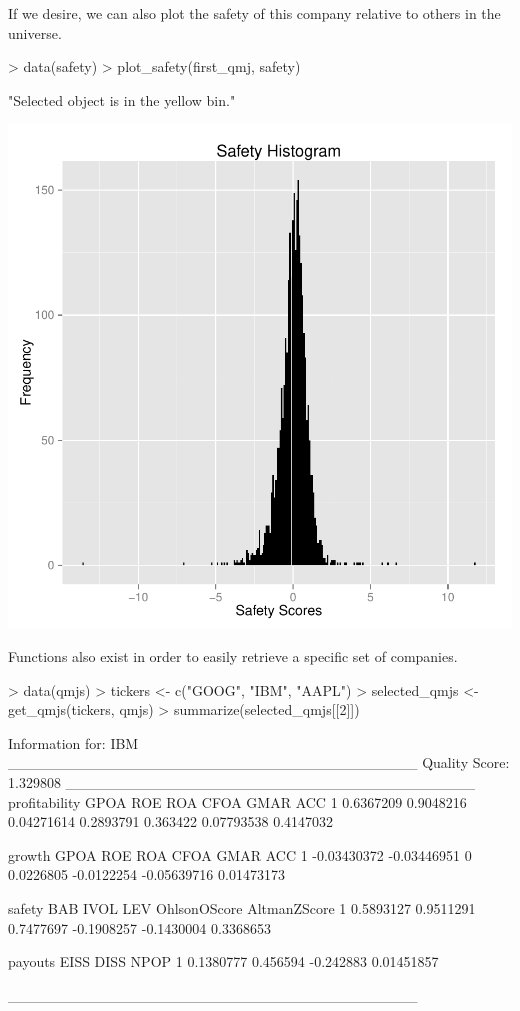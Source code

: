 \documentclass[titlepage]{article}
\begin{document}
If we desire, we can also plot the safety of this company relative to others in the universe.

\begin{Schunk}
\begin{Sinput}
> data(safety)
> plot_safety(first_qmj, safety)
\end{Sinput}
\begin{Soutput}
[1] "Selected object is in the yellow bin."
\end{Soutput}
\end{Schunk}
\includegraphics{paper-005}

Functions also exist in order to easily retrieve a specific set of companies.

\begin{Schunk}
\begin{Sinput}
> data(qmjs)
> tickers <- c("GOOG", "IBM", "AAPL")
> selected_qmjs <- get_qmjs(tickers, qmjs)
> summarize(selected_qmjs[[2]])
\end{Sinput}
\begin{Soutput}
Information for:  IBM
_______________________________________
Quality Score:  1.329808
_______________________________________
  profitability      GPOA        ROE       ROA     CFOA       GMAR       ACC
1     0.6367209 0.9048216 0.04271614 0.2893791 0.363422 0.07793538 0.4147032


       growth        GPOA ROE       ROA       CFOA        GMAR        ACC
1 -0.03430372 -0.03446951   0 0.0226805 -0.0122254 -0.05639716 0.01473173


     safety       BAB      IVOL        LEV OhlsonOScore AltmanZScore
1 0.5893127 0.9511291 0.7477697 -0.1908257   -0.1430004    0.3368653


    payouts     EISS      DISS       NPOP
1 0.1380777 0.456594 -0.242883 0.01451857

_______________________________________
\end{Soutput}
\end{Schunk}
\end{document}
